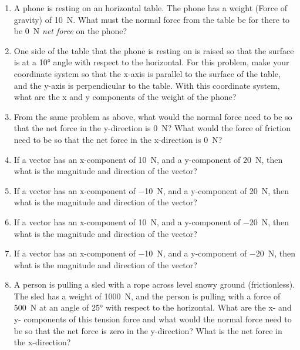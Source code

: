 \begin{enumerate}
\item A phone is resting on an horizontal table. The phone has a weight (Force of gravity) of \SI{10}{N}. What must the normal force from the table be for there to be \SI{0}{N} \emph{net force} on the phone?\\

\item One side of the table that the phone is resting on is raised so that the surface is at a \ang{10} angle with respect to the horizontal. For this problem, make your coordinate system so that the x-axis is parallel to the surface of the table, and the y-axis is perpendicular to the table. With this coordinate system, what are the x and y components of the weight of the phone? 
\hugeskip
\hugeskip

\item From the same problem as above, what would the normal force need to be so that the net force in the y-direction is \SI{0}{N}? What would the force of friction need to be so that the net force in the x-direction is \SI{0}{N}?
\hugeskip

\item If a vector has an x-component of \SI{+10}{N}, and a y-component of \SI{+20}{N}, then what is the magnitude and direction of the vector?
\hugeskip

\item If a vector has an x-component of \SI{-10}{N}, and a y-component of \SI{+20}{N}, then what is the magnitude and direction of the vector?
\hugeskip

\item If a vector has an x-component of \SI{+10}{N}, and a y-component of \SI{-20}{N}, then what is the magnitude and direction of the vector?
\hugeskip

\item If a vector has an x-component of \SI{-10}{N}, and a y-component of \SI{-20}{N}, then what is the magnitude and direction of the vector?
\hugeskip

\item A person is pulling a sled with a rope across level snowy ground (frictionless). The sled has a weight of \SI{1000}{N}, and the person is pulling with a force of \SI{500}{N} at an angle of \ang{25} with respect to the horizontal. What are the x- and y- components of this tension force and what would the normal force need to be so that the net force is zero in the y-direction? What is the net force in the x-direction?

\end{enumerate}